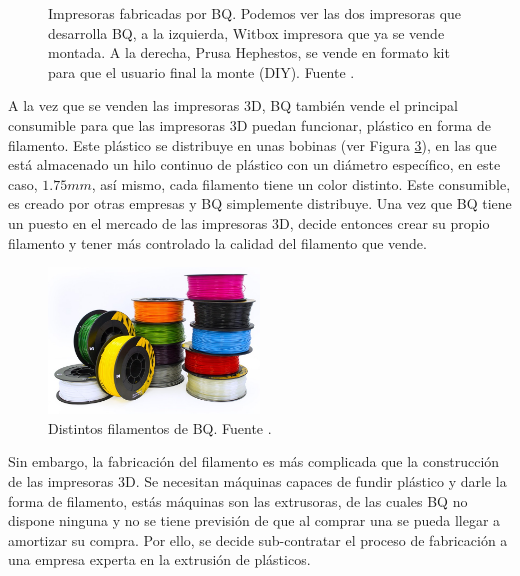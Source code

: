 \begin{figure}[h!]
\begin{subfigure}[b]{0.3\textwidth}
        \label{fig:estado_hephestos}
    \end{subfigure}
    \caption[Impresoras fabricadas por BQ.]{Impresoras fabricadas por BQ. Podemos ver las dos impresoras que desarrolla BQ, a la izquierda, Witbox impresora que ya se vende montada. A la derecha, Prusa Hephestos, se vende en formato kit para que el usuario final la monte (DIY). Fuente \cite{bq}.}
    \label{fig:impresoras_bq}
\end{figure}

A la vez que se venden las impresoras 3D, BQ también vende el principal consumible para que las impresoras 3D puedan funcionar, plástico en forma de filamento. Este plástico se distribuye en unas bobinas (ver Figura \ref{fig:estado_filamento}), en las que está almacenado un hilo continuo de plástico con un diámetro específico, en este caso, $1.75mm$, así mismo, cada filamento tiene un color distinto. Este consumible, es creado por otras empresas y BQ simplemente distribuye. Una vez que BQ tiene un puesto en el mercado de las impresoras 3D, decide entonces crear su propio filamento y tener más controlado la calidad del filamento que vende.\\

\begin{figure}[h!]
    \centering
    \includegraphics[width=0.5\textwidth]{images/filamento_bq.png}
    \caption[Distintos filamentos de BQ.]{Distintos filamentos de BQ. Fuente \cite{bq}.}
    \label{fig:estado_filamento}
\end{figure}

Sin embargo, la fabricación del filamento es más complicada que la construcción de las impresoras 3D. Se necesitan máquinas capaces de fundir plástico y darle la forma de filamento, estás máquinas son las extrusoras, de las cuales BQ no dispone ninguna y no se tiene previsión de que al comprar una se pueda llegar a amortizar su compra. Por ello, se decide sub-contratar el proceso de fabricación a una empresa experta en la extrusión de plásticos.\\

